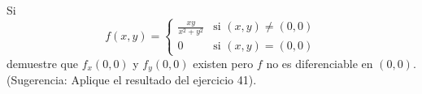 \item Si
\[ f(x,y) = \begin{cases} 
  \frac{xy}{x^2+y^2} & \text{si } (x,y) \neq (0,0) \\ 
  0 & \text{si } (x,y) = (0,0) 
\end{cases} \]
demuestre que $f_x(0, 0)$ y $f_y(0, 0)$ existen pero $f$ no es diferenciable en $(0, 0)$. (Sugerencia: Aplique el resultado del ejercicio 41).
